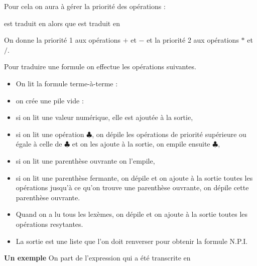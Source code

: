 Pour cela on aura à gérer la priorité des opérations :

 est traduit en  alors que
 est traduit en 

On donne la priorité 1 aux opérations $+$ et $-$ et la priorité 2 aux opérations $*$ et $/$.

\medskip

Pour traduire une formule on effectue les opérations suivantes.
\begin{itemize}
\item On lit la formule terme-à-terme :

\item on crée une pile vide :

\item si on lit une valeur numérique, elle est ajoutée à la sortie, 

\item si on lit une opération $\clubsuit$, on dépile les opérations de priorité supérieure ou égale à celle de $\clubsuit$ et on les ajoute à la sortie, on empile ensuite $\clubsuit$,

\item si on lit une parenthèse ouvrante on l'empile, 

\item si on lit une parenthèse fermante, on dépile et on ajoute à la sortie toutes les opérations jusqu'à ce qu'on trouve une parenthèse ouvrante, on dépile cette parenthèse ouvrante.

\item Quand on a lu tous les lexèmes, on dépile et on ajoute à la sortie toutes les opérations resytantes.

\item La sortie est une liste que l'on doit renverser pour obtenir la formule N.P.I.
\end{itemize}	

{\bf Un exemple}
On part de l'expression  qui a été transcrite en 
\begin{ocaml}
\end{ocaml}

